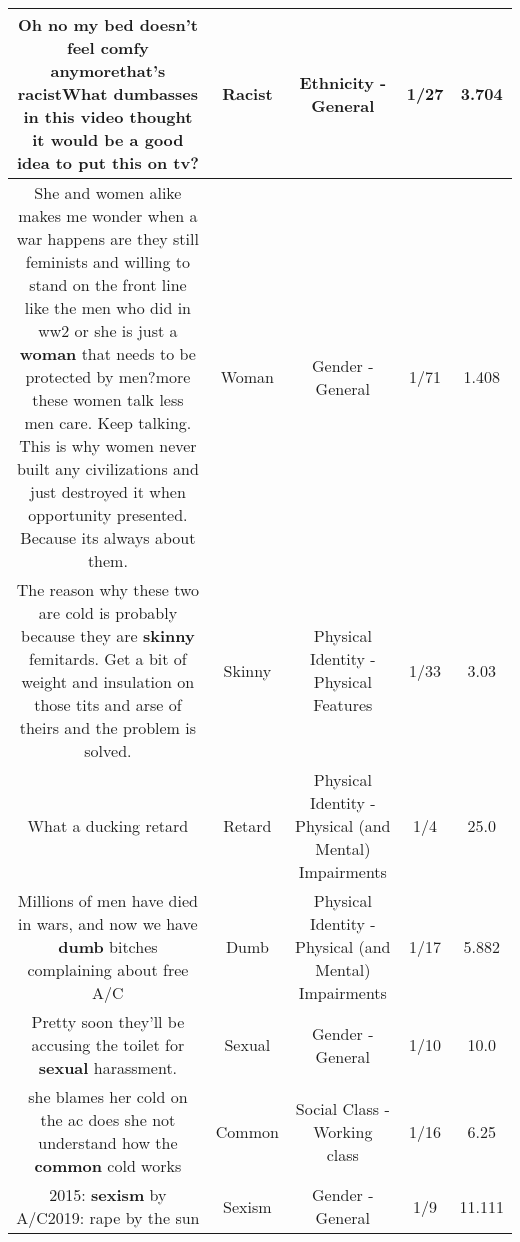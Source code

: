 \documentclass[11pt]{article}
\newlength\mylength
\begin{document}
\begin{center}
\begin{longtable}{|C{.65\mylength}|C{.30\mylength}|C{.12\mylength}|C{.12\mylength}|C{.12\mylength}|}
  \small Oh no my bed doesn't feel comfy anymorethat's \textbf{racist}What dumbasses in this video thought it would be a good idea to put this on tv?\normalsize   & Racist & Ethnicity - General & 1/27 & 3.704 \\  \hline
  \small She and women alike makes me wonder when a war happens are they still feminists and willing to stand on the front line like the men who did in ww2 or she is just a \textbf{woman} that needs to be protected by men?more these women talk less men care. Keep talking. This is why women never built any civilizations and just destroyed it when opportunity presented. Because its always about them.\normalsize   & Woman & Gender - General & 1/71 & 1.408 \\  \hline
  \small The reason why these two are cold is probably because they are \textbf{skinny} femitards. Get a bit of weight and insulation on those tits and arse of theirs and the problem is solved.\normalsize   & Skinny & Physical Identity - Physical Features & 1/33 & 3.03 \\  \hline
  \small What a ducking retard\normalsize   & Retard & Physical Identity - Physical (and Mental) Impairments & 1/4 & 25.0 \\  \hline
  \small Millions of men have died in wars, and now we have \textbf{dumb} bitches complaining about free A/C\normalsize   & Dumb & Physical Identity - Physical (and Mental) Impairments & 1/17 & 5.882 \\  \hline
  \small Pretty soon they'll be accusing the toilet for \textbf{sexual} harassment.\normalsize   & Sexual & Gender - General & 1/10 & 10.0 \\  \hline
  \small she blames her cold on the ac does she not understand how the \textbf{common} cold works\normalsize   & Common & Social Class - Working class & 1/16 & 6.25 \\  \hline
  \small 2015: \textbf{sexism} by A/C2019: rape by the sun\normalsize   & Sexism & Gender - General & 1/9 & 11.111 \\  \hline

\end{longtable}
\end{center}
\end{document}
